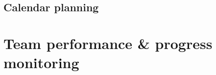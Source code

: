 \documentclass[a4paper,11pt]{article}
\begin{document}

\subsection{Calendar planning} %
\label{subsec:calendar_planning}



\section{Team performance \& progress monitoring} %
\label{sec:team_performance_progress_monitoring}

\end{document}
